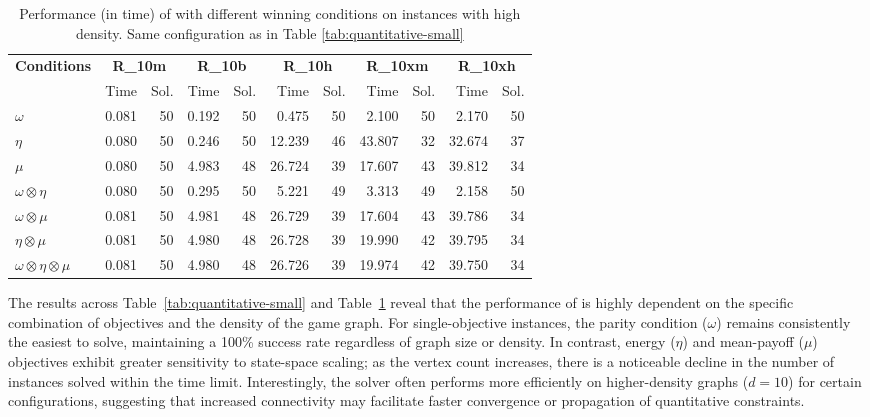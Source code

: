 \documentclass[runningheads]{llncs}
\begin{document}
\begin{table}[ht]
\centering
\caption{Performance (in time) of \nocq with different winning conditions on instances with high density. Same configuration as in Table \ref{tab:quantitative-small}}
\setlength{\tabcolsep}{1.2mm}
{\small 
\begin{tabular}{l|rr|rr|rr|rr|rr}
\toprule
\textbf{Conditions} & \multicolumn{2}{c|}{\textbf{R\_10m}} & \multicolumn{2}{c|}{\textbf{R\_10b}} & \multicolumn{2}{c|}{\textbf{R\_10h}} & \multicolumn{2}{c|}{\textbf{R\_10xm}} & \multicolumn{2}{c}{\textbf{R\_10xh}} \\
& Time & Sol. & Time & Sol. & Time & Sol. & Time & Sol. & Time & Sol. \\
\midrule
\textbf{$\omega$}
    & 0.081 & 50 & 0.192 & 50 & 0.475 & 50 & 2.100 & 50 & 2.170 & 50 \\
\textbf{$\eta$}
    & 0.080 & 50 & 0.246 & 50 & 12.239& 46 & 43.807& 32 & 32.674& 37 \\
\textbf{$\mu$}
    & 0.080 & 50 & 4.983 & 48 & 26.724& 39 & 17.607& 43 & 39.812& 34 \\
\textbf{$\omega \otimes \eta$}
    & 0.080 & 50 & 0.295 & 50 & 5.221 & 49 & 3.313 & 49 & 2.158 & 50 \\
\textbf{$\omega \otimes \mu$}
    & 0.081 & 50 & 4.981 & 48 & 26.729& 39 & 17.604& 43 & 39.786& 34 \\
\textbf{$\eta \otimes \mu$}
    & 0.081 & 50 & 4.980 & 48 & 26.728& 39 & 19.990& 42 & 39.795& 34 \\
\textbf{$\omega \otimes \eta \otimes \mu$}
    & 0.081 & 50 & 4.980 & 48 & 26.726& 39 & 19.974& 42 & 39.750& 34 \\
\bottomrule
\end{tabular}
}
\label{tab:quantitative-large}
\end{table}

The results across Table~\ref{tab:quantitative-small} and Table~\ref{tab:quantitative-large} reveal that the performance of \nocq is highly dependent on the specific combination of objectives and the density of the game graph. For single-objective instances, the parity condition ($\omega$) remains consistently the easiest to solve, maintaining a 100\% success rate regardless of graph size or density. In contrast, energy ($\eta$) and mean-payoff ($\mu$) objectives exhibit greater sensitivity to state-space scaling; as the vertex count increases, there is a noticeable decline in the number of instances solved within the time limit. Interestingly, the solver often performs more efficiently on higher-density graphs ($d=10$) for certain configurations, suggesting that increased connectivity may facilitate faster convergence or propagation of quantitative constraints.
\end{document}
